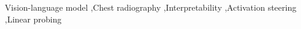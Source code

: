 \documentclass[a4paper,fleqn]{cas-dc}
\begin{document}
\begin{keywords}
Vision-language model \sep Chest radiography \sep Interpretability \sep Activation steering \sep Linear probing
\end{keywords}

\maketitle








\begingroup
\raggedright


\endgroup
\end{document}
